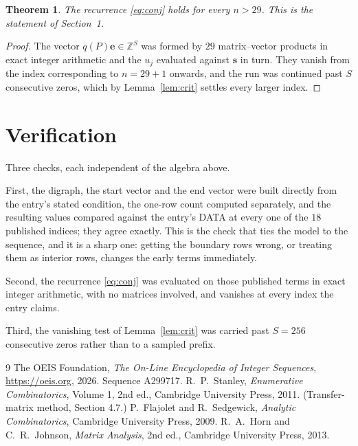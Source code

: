 \documentclass[11pt,a4paper]{article}
\theoremstyle{plain}
\newtheorem{theorem}{Theorem}
\theoremstyle{definition}
\begin{document}
\begin{theorem}
The recurrence \eqref{eq:conj} holds for every $n>29$. This is the statement of
Section~1.
\end{theorem}

\begin{proof}
The vector $q(P)\mathbf{e}\in\mathbb{Z}^{S}$ was formed by $29$ matrix--vector
products in exact integer arithmetic and the $u_j$ evaluated against $\mathbf{s}$ in turn.
They vanish from the index corresponding to $n=29+1$ onwards, and the run was continued
past $S$ consecutive zeros, which by Lemma~\ref{lem:crit} settles every larger index.
\end{proof}

\section{Verification}

Three checks, each independent of the algebra above.

First, the digraph, the start vector and the end vector were built directly from the
entry's stated condition, the one-row count computed separately, and the resulting values
compared against the entry's DATA at every one of the $18$ published indices; they
agree exactly. This is the check that ties the model to the sequence, and it is a sharp one:
getting the boundary rows wrong, or treating them as interior rows, changes the early terms
immediately.

Second, the recurrence \eqref{eq:conj} was evaluated on those published terms in exact
integer arithmetic, with no matrices involved, and vanishes at every index the entry claims.

Third, the vanishing test of Lemma~\ref{lem:crit} was carried past $S=256$ consecutive
zeros rather than to a sampled prefix.

\begin{thebibliography}{9}
 The OEIS Foundation, \emph{The On-Line Encyclopedia of Integer
Sequences}, \url{https://oeis.org}, 2026. Sequence A299717.
 R.~P.~Stanley, \emph{Enumerative Combinatorics}, Volume 1, 2nd ed.,
Cambridge University Press, 2011. (Transfer-matrix method, Section 4.7.)
 P.~Flajolet and R.~Sedgewick, \emph{Analytic Combinatorics}, Cambridge
University Press, 2009.
 R.~A.~Horn and C.~R.~Johnson, \emph{Matrix Analysis}, 2nd ed., Cambridge
University Press, 2013.
\end{thebibliography}
\end{document}
